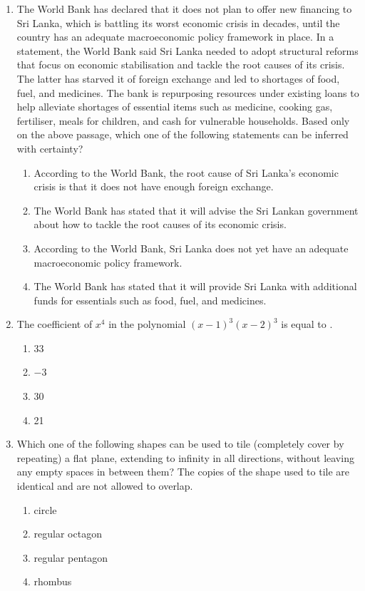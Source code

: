 \documentclass{article}
\begin{document}
\begin{enumerate}[leftmargin=*]
\item The World Bank has declared that it does not plan to offer new financing to Sri Lanka, which is battling its worst economic crisis in decades, until the country has an adequate macroeconomic policy framework in place. In a statement, the World Bank said Sri Lanka needed to adopt structural reforms that focus on economic stabilisation and tackle the root causes of its crisis. The latter has starved it of foreign exchange and led to shortages of food, fuel, and medicines. The bank is repurposing resources under existing loans to help alleviate shortages of essential items such as medicine, cooking gas, fertiliser, meals for children, and cash for vulnerable households. Based only on the above passage, which one of the following statements can be inferred with certainty?
\begin{multicols}{2}
\begin{enumerate}
\item According to the World Bank, the root cause of Sri Lanka’s economic crisis is that it does not have enough foreign exchange.
\item The World Bank has stated that it will advise the Sri Lankan government about how to tackle the root causes of its economic crisis.
\item According to the World Bank, Sri Lanka does not yet have an adequate macroeconomic policy framework.
\item The World Bank has stated that it will provide Sri Lanka with additional funds for essentials such as food, fuel, and medicines.
\end{enumerate}
\end{multicols}

\item The coefficient of $x^4$ in the polynomial $(x - 1)^3(x - 2)^3$ is equal to \underline{\hspace{1.5cm}}.
\begin{multicols}{4}
\begin{enumerate}
\item 33
\item $-3$
\item 30
\item 21
\end{enumerate}
\end{multicols}

\item Which one of the following shapes can be used to tile (completely cover by repeating) a flat plane, extending to infinity in all directions, without leaving any empty spaces in between them? The copies of the shape used to tile are identical and are not allowed to overlap.
\begin{multicols}{4}
\begin{enumerate}
\item circle
\item regular octagon
\item regular pentagon
\item rhombus
\end{enumerate}
\end{multicols}
\end{enumerate}
\end{document}
